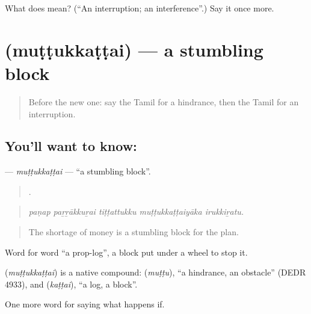 \begin{tcolorbox}[breakable,colback=teal!4,colframe=teal!35!black,title={Before you move on}]
What does  mean? (\textquotedblleft{}An interruption; an interference\textquotedblright{}.) Say it once more.
\end{tcolorbox}
\section[\texorpdfstring{\ta{முட்டுக்கட்டை} (muṭṭukkaṭṭai)}{முட்டுக்கட்டை (muṭṭukkaṭṭai)}]{ (muṭṭukkaṭṭai) — a stumbling block}

\label{lesson:TA-C546-muttukkattai}



\begin{quote}
Before the new one: say the Tamil for a hindrance, then the Tamil for an interruption.
\end{quote}

\subsection*{You'll want to know: }
\textbf{} — \emph{muṭṭukkaṭṭai} — \textquotedblleft{}a stumbling block\textquotedblright{}.

\begin{quote}
    .
\end{quote}

\begin{quote}
\emph{paṇap paṟṟākkuṟai tiṭṭattukku muṭṭukkaṭṭaiyāka irukkiṟatu.}
\end{quote}

\begin{quote}
The shortage of money is a stumbling block for the plan.
\end{quote}

Word for word \textquotedblleft{}a prop-log\textquotedblright{}, a block put under a wheel to stop it.

\begin{cousinweb}
\textbf{} (\emph{muṭṭukkaṭṭai}) is a native compound:  (\emph{muṭṭu}), \textquotedblleft{}a hindrance, an obstacle\textquotedblright{} (DEDR 4933), and  (\emph{kaṭṭai}), \textquotedblleft{}a log, a block\textquotedblright{}.
\end{cousinweb}

\begin{grammarlens}[title={What you've built}]
One more word for saying what happens if.
\end{grammarlens}

